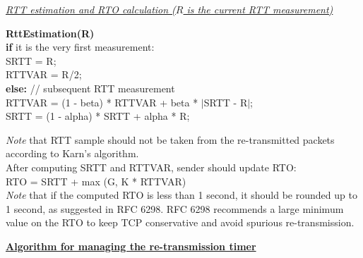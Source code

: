 \documentclass[10pt]{article}
\begin{document}
\underline{\emph{RTT estimation and RTO calculation ($R$ is the
    current RTT measurement)}}
\begin{mdframed}
  \textbf{RttEstimation(R)}\\
  \-\hspace{2em} \textbf{if} it is the very first measurement:\\
  \-\hspace{4em} SRTT = R;\\
  \-\hspace{4em} RTTVAR = R/2;\\
  \-\hspace{2em} \textbf{else:} // subsequent RTT measurement\\
  \-\hspace{4em} RTTVAR = (1 - beta) * RTTVAR + beta * $|$SRTT - R$|$;\\
  \-\hspace{4em} SRTT = (1 - alpha) * SRTT + alpha * R;
\end{mdframed}

\emph{Note} that RTT sample should not be taken from the
re-transmitted packets according to Karn's algorithm.\\

\vspace{1em}
After computing SRTT and RTTVAR, sender should update RTO:\\

\-\hspace{2em} RTO = SRTT + max (G, K * RTTVAR)\\

\emph{Note} that if the computed RTO is less than 1 second, it should be
rounded up to 1 second, as suggested in RFC 6298.  RFC 6298
recommends a large minimum value on the RTO to keep TCP conservative
and avoid spurious re-transmission.

\vspace{2em}
\underline{\textbf{Algorithm for managing the re-transmission
    timer}}\\
\end{document}
